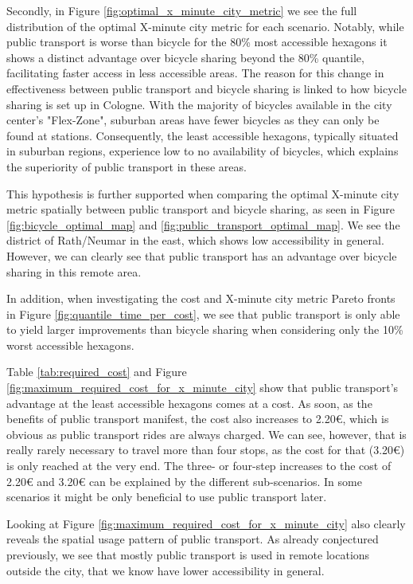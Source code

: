 Secondly, in Figure \ref{fig:optimal_x_minute_city_metric} we see the full distribution of the optimal X-minute city metric for each scenario.
Notably, while public transport is worse than bicycle for the 80\% most accessible hexagons it shows a distinct advantage over bicycle sharing beyond the 80\% quantile, facilitating faster access in less accessible areas. 
The reason for this change in effectiveness between public transport and bicycle sharing is linked to how bicycle sharing is set up in Cologne. 
With the majority of bicycles available in the city center's "Flex-Zone", suburban areas have fewer bicycles as they can only be found at stations.
Consequently, the least accessible hexagons, typically situated in suburban regions, experience low to no availability of bicycles, which explains the superiority of public transport in these areas. 

This hypothesis is further supported when comparing the optimal X-minute city metric spatially between public transport and bicycle sharing, as seen in Figure \ref{fig:bicycle_optimal_map} and \ref{fig:public_transport_optimal_map}.
We see the district of Rath/Neumar in the east, which shows low accessibility in general.
However, we can clearly see that public transport has an advantage over bicycle sharing in this remote area.

In addition, when investigating the cost and X-minute city metric Pareto fronts in Figure \ref{fig:quantile_time_per_cost}, we see that public transport is only able to yield larger improvements than bicycle sharing when considering only the 10\% worst accessible hexagons.

Table \ref{tab:required_cost} and Figure \ref{fig:maximum_required_cost_for_x_minute_city} show that public transport's advantage at the least accessible hexagons comes at a cost.
As soon, as the benefits of public transport manifest, the cost also increases to 2.20€, which is obvious as public transport rides are always charged.
We can see, however, that is really rarely necessary to travel more than four stops, as the cost for that (3.20€) is only reached at the very end. 
The three- or four-step increases to the cost of 2.20€ and 3.20€ can be explained by the different sub-scenarios.
In some scenarios it might be only beneficial to use public transport later.

Looking at Figure \ref{fig:maximum_required_cost_for_x_minute_city} also clearly reveals the spatial usage pattern of public transport.
As already conjectured previously, we see that mostly public transport is used in remote locations outside the city, that we know have lower accessibility in general.

